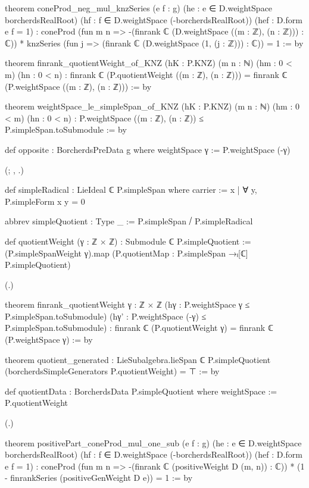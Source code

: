 \begin{leancode}
theorem coneProd_neg_mul_knzSeries (e f : g) (he : e ∈ D.weightSpace borcherdsRealRoot)
    (hf : f ∈ D.weightSpace (-borcherdsRealRoot)) (hef : D.form e f = 1) :
    coneProd (fun m n => -(finrank ℂ (D.weightSpace ((m : ℤ), (n : ℤ))) : ℂ)) *
      knzSeries (fun j => (finrank ℂ (D.weightSpace (1, (j : ℤ))) : ℂ)) = 1 := by

theorem finrank_quotientWeight_of_KNZ (hK : P.KNZ) (m n : ℕ) (hm : 0 < m) (hn : 0 < n) :
    finrank ℂ (P.quotientWeight ((m : ℤ), (n : ℤ))) =
      finrank ℂ (P.weightSpace ((m : ℤ), (n : ℤ))) := by

theorem weightSpace_le_simpleSpan_of_KNZ (hK : P.KNZ) (m n : ℕ) (hm : 0 < m) (hn : 0 < n) :
    P.weightSpace ((m : ℤ), (n : ℤ)) ≤ P.simpleSpan.toSubmodule := by

def opposite : BorcherdsPreData g where
  weightSpace γ := P.weightSpace (-γ)
\end{leancode}
(; , .)
\begin{leancode}
def simpleRadical : LieIdeal ℂ P.simpleSpan where
  carrier := {x | ∀ y, P.simpleForm x y = 0}

abbrev simpleQuotient : Type _ := P.simpleSpan ⧸ P.simpleRadical

def quotientWeight (γ : ℤ × ℤ) : Submodule ℂ P.simpleQuotient :=
  (P.simpleSpanWeight γ).map (P.quotientMap : P.simpleSpan →ₗ[ℂ] P.simpleQuotient)
\end{leancode}
(.)
\begin{leancode}
theorem finrank_quotientWeight {γ : ℤ × ℤ} (hγ : P.weightSpace γ ≤ P.simpleSpan.toSubmodule)
    (hγ' : P.weightSpace (-γ) ≤ P.simpleSpan.toSubmodule) :
    finrank ℂ (P.quotientWeight γ) = finrank ℂ (P.weightSpace γ) := by

theorem quotient_generated :
    LieSubalgebra.lieSpan ℂ P.simpleQuotient (borcherdsSimpleGenerators P.quotientWeight) = ⊤ := by

def quotientData : BorcherdsData P.simpleQuotient where
  weightSpace := P.quotientWeight
\end{leancode}
(.)
\begin{leancode}
theorem positivePart_coneProd_mul_one_sub (e f : g) (he : e ∈ D.weightSpace borcherdsRealRoot)
    (hf : f ∈ D.weightSpace (-borcherdsRealRoot)) (hef : D.form e f = 1) :
    coneProd (fun m n => -(finrank ℂ (positiveWeight D (m, n)) : ℂ)) *
      (1 - finrankSeries (positiveGenWeight D e)) = 1 := by
\end{leancode}
